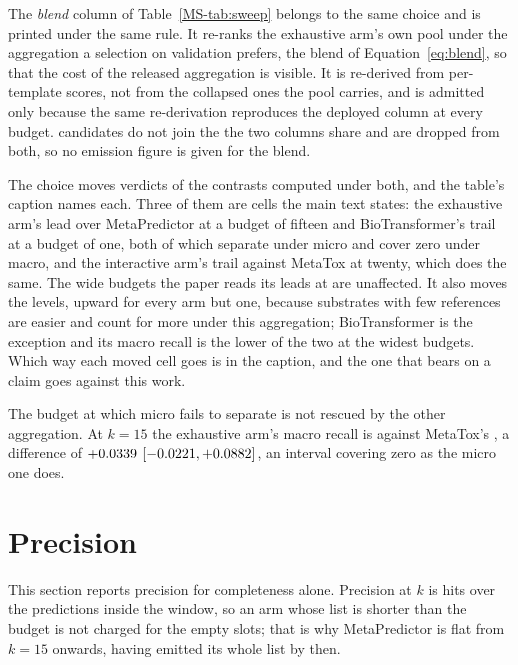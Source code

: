 \documentclass[journal=jcisd8,manuscript=suppinfo,layout=onecolumn]{achemso}
\begin{document}
The \emph{blend} column of Table~\ref{MS-tab:sweep} belongs to the same choice and is printed
under the same rule. It re-ranks the exhaustive arm's own pool under the aggregation a selection on
validation prefers, the blend of Equation~\ref{eq:blend}, so that the cost of the released
aggregation is visible. It is re-derived from per-template scores, not
from the collapsed ones the pool carries, and is admitted only because the same re-derivation
reproduces the deployed column at every budget. \numAggregationUnjoined{} candidates do not join
the \numAggregationJoined{} the two columns share and are dropped from both, so no emission
figure is given for the blend.

The choice moves \numAggregationMovedWord{} verdicts of the \numAggregationContrasts{}
contrasts computed under both, and the table's caption names each. Three of them are cells the main
text states: the exhaustive
arm's lead over MetaPredictor at a budget of fifteen and BioTransformer's trail at a budget of
one, both of which separate under micro and cover zero under macro, and the interactive arm's trail
against MetaTox at twenty, which does the same. The wide budgets the paper reads its leads at
are unaffected. It also moves the levels, upward for every arm but one,
because substrates with few references are easier and count for more under this aggregation;
BioTransformer is the exception and its macro recall is the lower of the two at the widest
budgets. Which way each moved cell goes is in the caption, and the one that bears on a claim goes
against
this work.

The budget at which micro fails to separate is not rescued by the other aggregation. At $k=15$ the
exhaustive arm's macro recall is \numMacroBankOneFive{} against MetaTox's
\numMacroMetatoxOneFive{}, a difference of $+0.0339$
$[-0.0221, +0.0882]$, an interval covering
zero as the micro one does.

\section{Precision}
\label{sec:si-precision}

This section reports precision for completeness alone.
Precision at $k$ is hits over the predictions inside the window, so an arm whose list is shorter
than the budget is not charged for the empty slots; that is why MetaPredictor is flat from $k=15$
onwards, having emitted its whole list by then.
\end{document}
